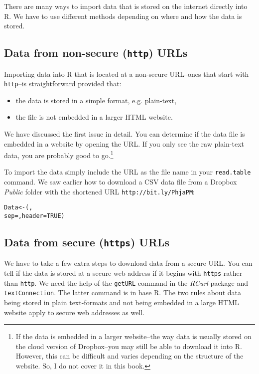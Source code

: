 There are many ways to import data that is stored on the internet directly into R. We have to use different methods depending on where and how the data is stored. 

\subsection{Data from non-secure ({\tt{http}}) URLs}

Importing data into R that is located at a non-secure URL--ones that start with {\tt{http}}--is straightforward provided that:

\begin{itemize}
	\item the data is stored in a simple format, e.g. plain-text,
	\item the file is not embedded in a larger HTML website.
\end{itemize}

We have discussed the first issue in detail. You can determine if the data file is embedded in a website by opening the URL. If you only see the raw plain-text data, you are probably good to go.\footnote{If the data is embedded in a larger website--the way data is usually stored on the cloud version of Dropbox--you may still be able to download it into R. However, this can be difficult and varies depending on the structure of the website. So, I do not cover it in this book.}

To import the data simply include the URL as the file name in your \texttt{read.table} command. We saw earlier how to download a CSV data file from a Dropbox \emph{Public} folder with the shortened URL \texttt{http://bit.ly/PhjaPM}:

\begin{knitrout}
\color{fgcolor}\begin{kframe}
\begin{alltt}
Data <- (, 
					sep = , header = TRUE)
\end{alltt}
\end{kframe}
\end{knitrout}


\subsection{Data from secure ({\tt{https}}) URLs}\label{SecureDataDownload}

\noindent We have to take a few extra steps to download data from a secure URL. You can tell if the data is stored at a secure web address if it begins with \texttt{https} rather than \texttt{http}. We need the help of the \texttt{getURL} command in the {\emph{RCurl}} package \cite[]{R-RCurl} and \texttt{textConnection}. The latter command is in base R. The two rules about data being stored in plain text-formats and not being embedded in a large HTML website apply to secure web addresses as well.

